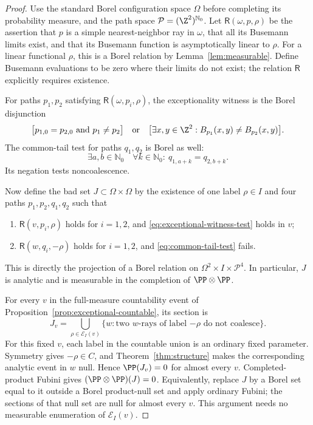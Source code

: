 \begin{proof}
Use the standard Borel configuration space $\Omega$ before completing
its probability measure, and the path space
$\mathcal P=(\Z^2)^{\mathbb N_0}$.  Let
$\mathsf R(\omega,p,\rho)$ be the assertion that $p$ is a simple
nearest-neighbor ray in $\omega$, that all its Busemann limits exist,
and that its Busemann function is asymptotically linear to $\rho$.
For a linear functional $\rho$, this is a Borel relation by
Lemma~\ref{lem:measurable}. Define Busemann evaluations to be zero
where their limits do not exist; the relation $\mathsf R$ explicitly
requires existence.

For paths $p_1,p_2$ satisfying $\mathsf R(\omega,p_i,\rho)$, the
exceptionality witness is the Borel disjunction
\begin{equation}
 \bigl[p_{1,0}=p_{2,0}\ \text{and}\ p_1\ne p_2\bigr]
 \quad\text{or}\quad
 \bigl[\exists x,y\in\Z^2:
 B_{p_1}(x,y)\ne B_{p_2}(x,y)\bigr].
 \label{eq:exceptional-witness-test}
\end{equation}
The common-tail test for paths $q_1,q_2$ is Borel as well:
\begin{equation}
 \exists a,b\in\mathbb N_0\quad
 \forall k\in\mathbb N_0:\ q_{1,a+k}=q_{2,b+k}.
 \label{eq:common-tail-test}
\end{equation}
Its negation tests noncoalescence.

Now define the bad set $J\subset\Omega\times\Omega$ by the existence
of one label $\rho\in I$ and four paths $p_1,p_2,q_1,q_2$ such that
\begin{enumerate}[label=(\alph*)]
\item $\mathsf R(v,p_i,\rho)$ holds for $i=1,2$, and
      \eqref{eq:exceptional-witness-test} holds in $v$;
\item $\mathsf R(w,q_i,-\rho)$ holds for $i=1,2$, and
      \eqref{eq:common-tail-test} fails.
\end{enumerate}
This is directly the projection of a Borel relation on
$\Omega^2\times I\times\mathcal P^4$.  In particular, $J$ is
analytic and is measurable in the completion of $\PP\otimes\PP$.

For every $v$ in the full-measure countability event of
Proposition~\ref{prop:exceptional-countable}, its section is
\begin{equation}
 J_v=\bigcup_{\rho\in\mathcal E_I(v)}
 \{w:\text{two $w$-rays of label $-\rho$ do not coalesce}\}.
 \label{eq:countable-null-section}
\end{equation}
For this fixed $v$, each label in the countable union is an ordinary
fixed parameter.  Symmetry gives $-\rho\in C$, and
Theorem~\ref{thm:structure} makes the corresponding analytic event
in $w$ null.  Hence $\PP(J_v)=0$ for almost every $v$.
Completed-product Fubini gives
$(\PP\otimes\PP)(J)=0$.  Equivalently, replace $J$ by a Borel set
equal to it outside a Borel product-null set and apply ordinary
Fubini; the sections of that null set are null for almost every
$v$.  This argument needs no measurable enumeration of
$\mathcal E_I(v)$.


\end{proof}
